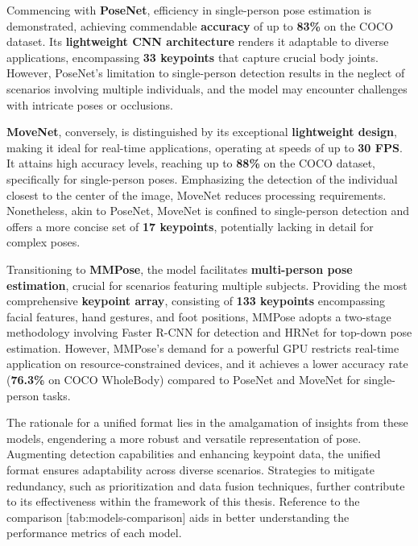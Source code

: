 Commencing with {\bf PoseNet}, efficiency in single-person pose estimation is demonstrated, achieving commendable {\bf accuracy} of up to {\bf 83\%} on the COCO dataset. Its {\bf lightweight CNN architecture} renders it adaptable to diverse applications, encompassing {\bf 33 keypoints} that capture crucial body joints. However, PoseNet's limitation to single-person detection results in the neglect of scenarios involving multiple individuals, and the model may encounter challenges with intricate poses or occlusions.

{\bf MoveNet}, conversely, is distinguished by its exceptional {\bf lightweight design}, making it ideal for real-time applications, operating at speeds of up to {\bf 30 FPS}. It attains high accuracy levels, reaching up to {\bf 88\%} on the COCO dataset, specifically for single-person poses. Emphasizing the detection of the individual closest to the center of the image, MoveNet reduces processing requirements. Nonetheless, akin to PoseNet, MoveNet is confined to single-person detection and offers a more concise set of {\bf 17 keypoints}, potentially lacking in detail for complex poses.

Transitioning to {\bf MMPose}, the model facilitates {\bf multi-person pose estimation}, crucial for scenarios featuring multiple subjects. Providing the most comprehensive {\bf keypoint array}, consisting of {\bf 133 keypoints} encompassing facial features, hand gestures, and foot positions, MMPose adopts a two-stage methodology involving Faster R-CNN for detection and HRNet for top-down pose estimation. However, MMPose's demand for a powerful GPU restricts real-time application on resource-constrained devices, and it achieves a lower accuracy rate ({\bf 76.3\%} on COCO WholeBody) compared to PoseNet and MoveNet for single-person tasks.

The rationale for a unified format lies in the amalgamation of insights from these models, engendering a more robust and versatile representation of pose. Augmenting detection capabilities and enhancing keypoint data, the unified format ensures adaptability across diverse scenarios. Strategies to mitigate redundancy, such as prioritization and data fusion techniques, further contribute to its effectiveness within the framework of this thesis. Reference to the comparison [tab:models-comparison] aids in better understanding the performance metrics of each model.

